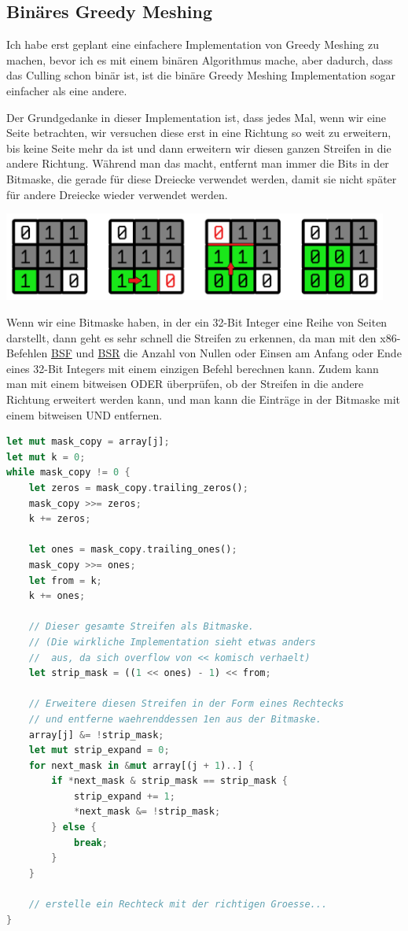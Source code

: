 \subsection{Binäres Greedy Meshing}

Ich habe erst geplant eine einfachere Implementation
von Greedy Meshing zu machen, bevor ich es mit
einem binären Algorithmus mache, aber dadurch,
dass das Culling schon binär ist, ist die binäre
Greedy Meshing Implementation sogar einfacher als
eine andere.

Der Grundgedanke in dieser Implementation ist,
dass jedes Mal, wenn wir eine Seite betrachten,
wir versuchen diese erst in eine Richtung so weit
zu erweitern, bis keine Seite mehr da ist und dann
erweitern wir diesen ganzen Streifen in die andere
Richtung.
Während man das macht, entfernt man immer die
Bits in der Bitmaske, die gerade für diese Dreiecke
verwendet werden, damit sie nicht später für andere
Dreiecke wieder verwendet werden.

\begin{center}
\includegraphics[width=0.95\textwidth]{../assets/greedy/grid_visualization.png}
\end{center}

Wenn wir eine Bitmaske haben, in der ein
32-Bit Integer eine Reihe von Seiten darstellt,
dann geht es sehr schnell die Streifen zu erkennen,
da man mit den x86-Befehlen
\href{https://www.felixcloutier.com/x86/bsf}{BSF} \cite{bsf}
und
\href{https://www.felixcloutier.com/x86/bsr}{BSR} \cite{bsr}
die Anzahl von Nullen oder Einsen am Anfang oder
Ende eines 32-Bit Integers mit einem einzigen
Befehl berechnen kann.
Zudem kann man mit einem bitweisen ODER
überprüfen, ob der Streifen in die andere Richtung
erweitert werden kann, und man kann die Einträge
in der Bitmaske mit einem bitweisen UND entfernen.

\begin{lstlisting}[language=Rust]
let mut mask_copy = array[j];
let mut k = 0;
while mask_copy != 0 {
	let zeros = mask_copy.trailing_zeros();
	mask_copy >>= zeros;
	k += zeros;

	let ones = mask_copy.trailing_ones();
	mask_copy >>= ones;
	let from = k;
	k += ones;

	// Dieser gesamte Streifen als Bitmaske.
	// (Die wirkliche Implementation sieht etwas anders
	//  aus, da sich overflow von << komisch verhaelt)
	let strip_mask = ((1 << ones) - 1) << from;

	// Erweitere diesen Streifen in der Form eines Rechtecks
	// und entferne waehrenddessen 1en aus der Bitmaske.
	array[j] &= !strip_mask;
	let mut strip_expand = 0;
	for next_mask in &mut array[(j + 1)..] {
		if *next_mask & strip_mask == strip_mask {
			strip_expand += 1;
			*next_mask &= !strip_mask;
		} else {
			break;
		}
	}

	// erstelle ein Rechteck mit der richtigen Groesse...
}
\end{lstlisting}

